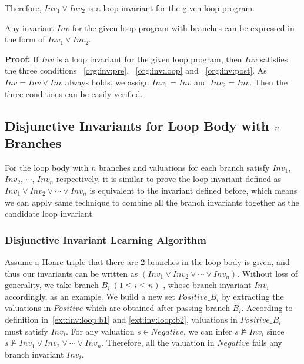 Therefore, $Inv_1 \vee Inv_2$ is a loop invariant for the given loop program. %

\begin{theorem}
\label{thm:invariant:is:disjunctive}
	Any invariant $Inv$ for the given loop program with branches can be expressed in the form of $Inv_1 \vee Inv_2$.
\end{theorem}

\noindent \textbf{Proof:} If $Inv$ is a loop invariant for the given loop program,
then $Inv$ satisfies the three conditions ~\ref{org:inv:pre}, ~\ref{org:inv:loop} and ~\ref{org:inv:post}.
As $Inv = Inv \vee Inv$ always holds, we assign $Inv_1 = Inv$ and $Inv_2 = Inv$.
Then the three conditions can be easily verified. %

\subsection{Disjunctive Invariants for Loop Body with $\emph{n}$ Branches}
For the loop body with $n$ branches and valuations for each branch satisfy $Inv_1$, $Inv_2$, $\cdots$, $Inv_n$ respectively,
it is similar to prove the loop invariant defined as $Inv_1 \vee Inv_2 \vee \cdots \vee Inv_n$ is equivalent to the invariant defined before,
which means we can apply same technique to combine all the branch invariants together as the candidate loop invariant.

\subsubsection{Disjunctive Invariant Learning Algorithm}
Assume a Hoare triple that there are 2 branches in the loop body is given,
and thus our invariants can be written as $(Inv_1 \vee Inv_2 \vee \cdots \vee Inv_n)$.
Without loss of generality, we take branch $B_i~(1 \le i \le n)$ , whose branch invariant $Inv_i$ accordingly, as an example.
We build a new set $\mathit{Positive\_B_i}$ by extracting the valuations in $\mathit{Positive}$ which are obtained after passing branch $B_i$.
According to definition in~\ref{ext:inv:loop:b1} and \ref{ext:inv:loop:b2},
valuations in $\mathit{Positive\_B_i}$ must satisfy $Inv_i$.
For any valuation $s \in \mathit{Negative}$,
we can infer $s \not \models Inv_i$ since $s \not \models Inv_1 \vee Inv_2 \vee \cdots \vee Inv_n$.
Therefore, all the valuation in $\mathit{Negative}$ fails any branch invariant $Inv_i $.

